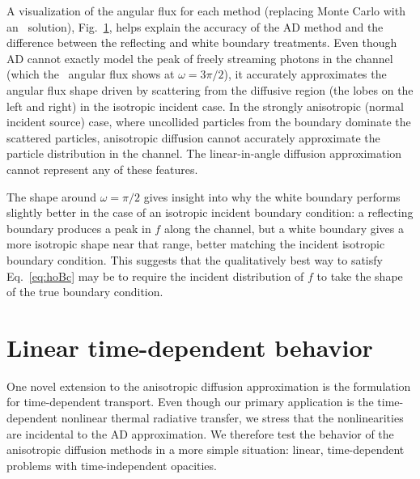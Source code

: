 A visualization of the angular flux for each method (replacing Monte Carlo with
an \SN\ solution), Fig.~\ref{fig:bcChannelIsotropicAngular}, helps explain the
accuracy
of the AD method and the difference between the reflecting and white boundary
treatments. Even though AD cannot exactly model the peak of freely streaming
photons in the channel (which the \SN\ angular flux shows at $\omega=3\pi/2$),
it accurately approximates the angular flux shape driven by scattering from the
diffusive region (the lobes on the left and right) in the isotropic incident
case. In the strongly anisotropic (normal incident source) case, where
uncollided particles from the boundary dominate the scattered particles,
anisotropic diffusion cannot accurately approximate the particle
distribution in the channel.
The linear-in-angle diffusion approximation cannot represent any of these
features.

\begin{figure}[htb]
  \centering\small
  \subfloat[Isotropic]{%
  \vspace{-.25in}%
  }%
  \subfloat[Normal]{%
  \vspace{-.25in}%
  }%
  \label{fig:bcChannelIsotropicAngular}
\end{figure}

The shape around $\omega=\pi/2$ gives insight into why the white boundary
performs slightly better in the case of an isotropic incident boundary
condition: a reflecting boundary produces a peak in $f$
along the channel, but a white boundary gives a more isotropic shape near that
range, better matching the incident isotropic boundary condition. This suggests
that the qualitatively best way to satisfy Eq.~\eqref{eq:hoBc} may be
to require the incident distribution of $f$ to take the shape of the true
boundary condition.

\clearpage
\section{Linear time-dependent behavior}

One novel extension to the anisotropic diffusion approximation is the
formulation for time-dependent transport. Even though our primary application is
the time-dependent nonlinear thermal radiative transfer, we stress that the
nonlinearities are incidental to the AD approximation. We therefore 
test the behavior of the anisotropic diffusion methods in a more simple
situation: linear, time-dependent problems with time-independent opacities.

